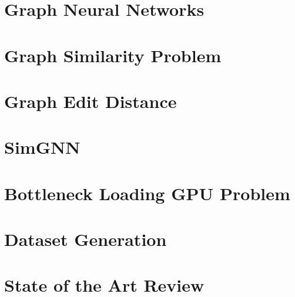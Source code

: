 \documentclass{article}
\begin{document}
\newpage
    
\newpage

\newpage
    \tableofcontents
\newpage


\section{Graph Neural Networks}
\section{Graph Similarity Problem}
\section{Graph Edit Distance}
\section{SimGNN}
\section{Bottleneck Loading GPU Problem}
\section{Dataset Generation}
\section{State of the Art Review}
\end{document}
